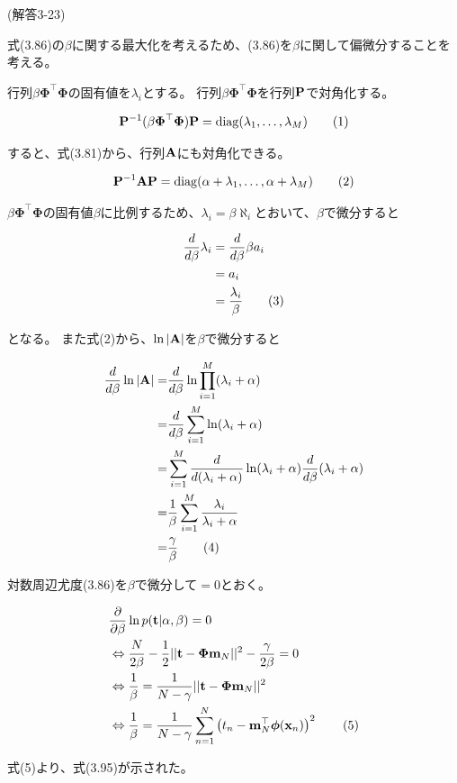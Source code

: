 \documentclass{jsarticle}
\begin{document}
(解答3-23)

式(3.86)の$\beta$に関する最大化を考えるため、(3.86)を$\beta$に関して偏微分することを考える。

行列$\beta{\boldsymbol\Phi}^\top{\boldsymbol\Phi}$の固有値を$\lambda_i$とする。
行列$\beta{\boldsymbol\Phi}^\top{\boldsymbol\Phi}$を行列$\bf P$で対角化する。

\begin{align}
    {\bf P}^{-1}(\beta{\boldsymbol\Phi}^\top{\boldsymbol\Phi}){\bf P}={\rm diag}(\lambda_1,\ldots,\lambda_M)\tag{1}
    \end{align}

すると、式(3.81)から、行列$\bf A$にも対角化できる。

\begin{align}
    {\bf P}^{-1}{\bf A}{\bf P}={\rm diag}(\alpha+\lambda_1,\ldots,\alpha+\lambda_M)\tag{2}
    \end{align}

$\beta{\boldsymbol\Phi}^\top{\boldsymbol\Phi}$の固有値$\beta$に比例するため、$\lambda_i = \beta \aleph_i$とおいて、$\beta$で微分すると

\begin{align}
    \frac{d}{d\beta}\lambda_i&=\frac{d}{d\beta}\beta a_i \notag \\
    &=a_i \notag\\
    &=\frac{\lambda_i}{\beta}\tag{3}
    \end{align}

となる。
また式(2)から、$\ln |\bf A|$を$\beta$で微分すると

\begin{align}
    \frac{d}{d\beta}\ln|{\bf A}|=&\frac{d}{d\beta}\ln\prod_{i=1}^M(\lambda_i+\alpha) \notag \\
    =&\frac{d}{d\beta}\sum_{i=1}^M\ln(\lambda_i+\alpha) \notag \\
    =&\sum_{i=1}^M\frac{d}{d(\lambda_i+\alpha)}\ln(\lambda_i+\alpha)\frac{d}{d\beta}(\lambda_i+\alpha) \notag \\
    =&\frac{1}{\beta}\sum_{i=1}^M\frac{\lambda_i}{\lambda_i+\alpha} \notag \\
    =&\frac{\gamma}{\beta}\tag{4}
    \end{align}

対数周辺尤度(3.86)を$\beta$で微分して$=0$とおく。

\begin{align}
    &\frac{\partial}{\partial\beta}\ln p({\bf t}|\alpha,\beta)=0 \notag \\
    &\Leftrightarrow\frac{N}{2\beta}-\frac{1}{2}||{\bf t}-{\boldsymbol\Phi}{\bf m}_N||^2-\frac{\gamma}{2\beta}=0 \notag \\
    &\Leftrightarrow\frac{1}{\beta}=\frac{1}{N-\gamma}||{\bf t}-{\boldsymbol\Phi}{\bf m}_N||^2 \notag \\
    &\Leftrightarrow\frac{1}{\beta}=\frac{1}{N-\gamma}\sum_{n=1}^N\left(t_n-{\bf m}_N^\top{\boldsymbol\phi}({\bf x}_n)\right)^2\tag{5}
    \end{align}

式(5)より、式(3.95)が示された。
\end{document}
